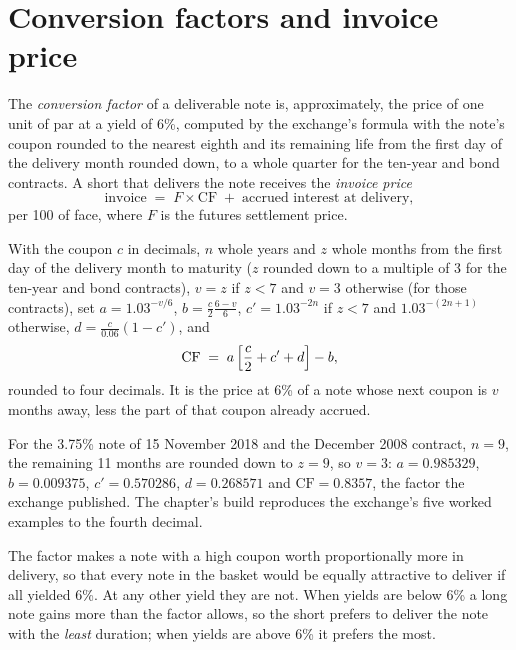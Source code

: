 \section{Conversion factors and invoice price}

\begin{definition}\label{def:m2:bond-futures:cf}
The \emph{conversion factor} of a deliverable note
is, approximately, the price of one unit of par at a yield of 6\%, computed by
the exchange's formula with the note's coupon rounded to the nearest eighth
and its remaining life from the first day of the delivery month rounded down,
to a whole quarter for the ten-year and bond contracts. A short that delivers
the note receives the \emph{invoice price}
\[
\text{invoice} \;=\; F \times \mathrm{CF} \;+\; \text{accrued interest at delivery},
\]
per 100 of face, where $F$ is the futures settlement price.
\end{definition}

\begin{method}\label{met:m2:bond-futures:cf}
With the coupon $c$ in decimals, $n$ whole years and $z$ whole months from the
first day of the delivery month to maturity ($z$ rounded down to a multiple of
3 for the ten-year and bond contracts), $v = z$ if $z < 7$ and $v = 3$
otherwise (for those contracts), set $a = 1.03^{-v/6}$, $b = \frac c2
\frac{6 - v}{6}$, $c' = 1.03^{-2n}$ if $z < 7$ and $1.03^{-(2n+1)}$ otherwise,
$d = \frac{c}{0.06}(1 - c')$, and
\[
\mathrm{CF} \;=\; a\,\Bigl[\frac c2 + c' + d\Bigr] - b,
\]
rounded to four decimals. It is the price at 6\% of a note whose next coupon
is $v$ months away, less the part of that coupon already accrued.
\end{method}

\begin{example}\label{ex:m2:bond-futures:cf}
For the 3.75\% note of 15 November 2018 and the December 2008
contract, $n = 9$, the remaining 11 months are rounded down to $z = 9$, so $v =
3$: $a = 0.985329$, $b = 0.009375$, $c' = 0.570286$, $d = 0.268571$ and
$\mathrm{CF} = 0.8357$, the factor the exchange published. The chapter's build
reproduces the exchange's five worked examples to the fourth decimal.
\end{example}

The factor makes a note with a high coupon worth proportionally more
in delivery, so that every note in the basket would be equally attractive to
deliver if all yielded 6\%. At any other yield they are not. When yields are
below 6\% a long note gains more than the factor allows, so the short prefers
to deliver the note with the \emph{least} duration; when yields are above 6\%
it prefers the most.

